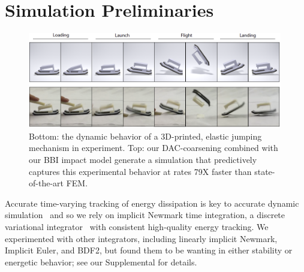 \section{Simulation Preliminaries}
\begin{figure}
	\centering
	\includegraphics[width=0.99\textwidth]{images/dynPhase.png}
	\caption{Bottom: the dynamic behavior of a 3D-printed, elastic jumping mechanism in experiment. Top: our DAC-coarsening combined with our BBI impact model generate a simulation that predictively captures this experimental behavior at rates 79X faster than state-of-the-art FEM.}
	\label{fig:simulationStage}
\end{figure}
\label{sec:simPrelim}
Accurate time-varying tracking of energy dissipation is key to accurate dynamic simulation~\cite{Marsden:2001dj} and so we rely on implicit Newmark time integration, a discrete variational integrator~\cite{Kane:2000dw} with consistent high-quality energy tracking. 
We experimented with other integrators, including linearly implicit Newmark, Implicit Euler, and BDF2, but found them to be wanting in either stability or energetic behavior; see our Supplemental for details.
